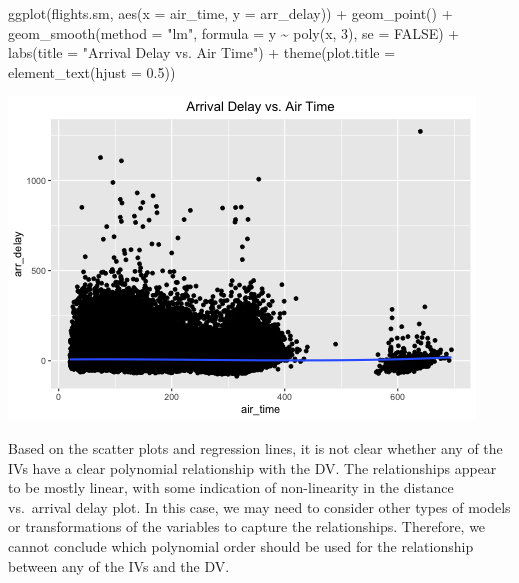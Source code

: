 \documentclass[
]{article}
\newenvironment{Shaded}{\begin{snugshade}}{\end{snugshade}}
\newcommand{\AttributeTok}[1]{\textcolor[rgb]{0.77,0.63,0.00}{#1}}
\newcommand{\ConstantTok}[1]{\textcolor[rgb]{0.00,0.00,0.00}{#1}}
\newcommand{\DecValTok}[1]{\textcolor[rgb]{0.00,0.00,0.81}{#1}}
\newcommand{\FloatTok}[1]{\textcolor[rgb]{0.00,0.00,0.81}{#1}}
\newcommand{\FunctionTok}[1]{\textcolor[rgb]{0.00,0.00,0.00}{#1}}
\newcommand{\NormalTok}[1]{#1}
\newcommand{\SpecialCharTok}[1]{\textcolor[rgb]{0.00,0.00,0.00}{#1}}
\newcommand{\StringTok}[1]{\textcolor[rgb]{0.31,0.60,0.02}{#1}}
\begin{document}
\begin{Shaded}
\begin{Highlighting}[]
\FunctionTok{ggplot}\NormalTok{(flights.sm, }\FunctionTok{aes}\NormalTok{(}\AttributeTok{x =}\NormalTok{ air\_time, }\AttributeTok{y =}\NormalTok{ arr\_delay)) }\SpecialCharTok{+} \FunctionTok{geom\_point}\NormalTok{() }\SpecialCharTok{+}
    \FunctionTok{geom\_smooth}\NormalTok{(}\AttributeTok{method =} \StringTok{"lm"}\NormalTok{, }\AttributeTok{formula =}\NormalTok{ y }\SpecialCharTok{\textasciitilde{}} \FunctionTok{poly}\NormalTok{(x, }\DecValTok{3}\NormalTok{), }\AttributeTok{se =} \ConstantTok{FALSE}\NormalTok{) }\SpecialCharTok{+}
    \FunctionTok{labs}\NormalTok{(}\AttributeTok{title =} \StringTok{"Arrival Delay vs. Air Time"}\NormalTok{) }\SpecialCharTok{+} \FunctionTok{theme}\NormalTok{(}\AttributeTok{plot.title =} \FunctionTok{element\_text}\NormalTok{(}\AttributeTok{hjust =} \FloatTok{0.5}\NormalTok{))}
\end{Highlighting}
\end{Shaded}

\includegraphics{HW4-Trinath-Sai-Subhash-Reddy-Pittala_files/figure-latex/unnamed-chunk-2-4.png}

Based on the scatter plots and regression lines, it is not clear whether
any of the IVs have a clear polynomial relationship with the DV. The
relationships appear to be mostly linear, with some indication of
non-linearity in the distance vs.~arrival delay plot. In this case, we
may need to consider other types of models or transformations of the
variables to capture the relationships. Therefore, we cannot conclude
which polynomial order should be used for the relationship between any
of the IVs and the DV.
\end{document}
